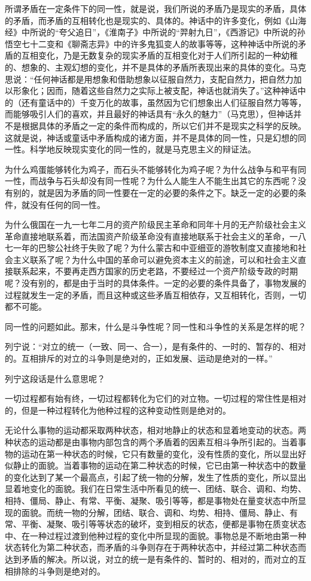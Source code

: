 所谓矛盾在一定条件下的同一性，就是说，我们所说的矛盾乃是现实的矛盾，具体的矛盾，而矛盾的互相转化也是现实的、具体的。神话中的许多变化，例如《山海经》中所说的“夸父追日”，《淮南子》中所说的“羿射九日”，《西游记》中所说的孙悟空七十二变和《聊斋志异》中的许多鬼狐变人的故事等等，这种神话中所说的矛盾的互相变化，乃是无数复杂的现实矛盾的互相变化对于人们所引起的一种幼稚的、想象的、主观幻想的变化，并不是具体的矛盾所表现出来的具体的变化。马克思说：“任何神话都是用想象和借助想象以征服自然力，支配自然力，把自然力加以形象化；因而，随着这些自然力之实际上被支配，神话也就消失了。”这种神话中的（还有童话中的）千变万化的故事，虽然因为它们想象出人们征服自然力等等，而能够吸引人们的喜欢，并且最好的神话具有“永久的魅力”（马克思），但神话并不是根据具体的矛盾之一定的条件而构成的，所以它们并不是现实之科学的反映。这就是说，神话或童话中矛盾构成的诸方面，并不是具体的同一性，只是幻想的同一性。科学地反映现实变化的同一性的，就是马克思主义的辩证法。

为什么鸡蛋能够转化为鸡子，而石头不能够转化为鸡子呢？为什么战争与和平有同一性，而战争与石头却没有同一性呢？为什么人能生人不能生出其它的东西呢？没有别的，就是因为矛盾的同一性要在一定的必要的条件之下。缺乏一定的必要的条件，就没有任何的同一性。

为什么俄国在一九一七年二月的资产阶级民主革命和同年十月的无产阶级社会主义革命直接地联系着，而法国资产阶级革命没有直接地联系于社会主义的革命，一八七一年的巴黎公社终于失败了呢？为什么蒙古和中亚细亚的游牧制度又直接地和社会主义联系了呢？为什么中国的革命可以避免资本主义的前途，可以和社会主义直接联系起来，不要再走西方国家的历史老路，不要经过一个资产阶级专政的时期呢？没有别的，都是由于当时的具体条件。一定的必要的条件具备了，事物发展的过程就发生一定的矛盾，而且这种或这些矛盾互相依存，又互相转化，否则，一切都不可能。

同一性的问题如此。那末，什么是斗争性呢？同一性和斗争性的关系是怎样的呢？

列宁说：“对立的统一（一致、同一、合一），是有条件的、一时的、暂存的、相对的。互相排斥的对立的斗争则是绝对的，正如发展、运动是绝对的一样。”

列宁这段话是什么意思呢？

一切过程都有始有终，一切过程都转化为它们的对立物。一切过程的常住性是相对的，但是一种过程转化为他种过程的这种变动性则是绝对的。

无论什么事物的运动都采取两种状态，相对地静止的状态和显着地变动的状态。两种状态的运动都是由事物内部包含的两个矛盾着的因素互相斗争所引起的。当着事物的运动在第一种状态的时候，它只有数量的变化，没有性质的变化，所以显出好似静止的面貌。当着事物的运动在第二种状态的时候，它已由第一种状态中的数量的变化达到了某一个最高点，引起了统一物的分解，发生了性质的变化，所以显出显着地变化的面貌。我们在日常生活中所看见的统一、团结、联合、调和、均势、相持、僵局、静止、有常、平衡、凝聚、吸引等等，都是事物处在量变状态中所显现的面貌。而统一物的分解，团结、联合、调和、均势、相持、僵局、静止、有常、平衡、凝聚、吸引等等状态的破坏，变到相反的状态，便都是事物在质变状态中、在一种过程过渡到他种过程的变化中所显现的面貌。事物总是不断地由第一种状态转化为第二种状态，而矛盾的斗争则存在于两种状态中，并经过第二种状态而达到矛盾的解决。所以说，对立的统一是有条件的、暂时的、相对的，而对立的互相排除的斗争则是绝对的。

